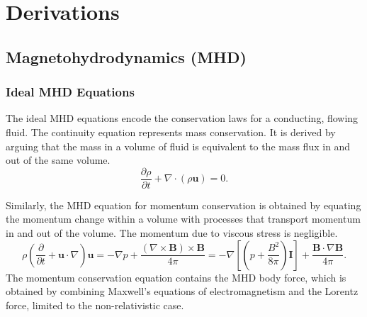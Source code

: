 \appendix

\chapter{Derivations}
\section{Magnetohydrodynamics (MHD)}

\subsection*{Ideal MHD Equations}
The ideal MHD equations encode the conservation laws for a conducting, flowing fluid.
The continuity equation represents mass conservation. It is derived by arguing that the mass in a volume of fluid is equivalent to the mass flux in and out of the same volume. 
\begin{equation}
    \label{eq:Continuity Eqn}
    \frac{\partial \rho}{\partial t} + \nabla \cdot (\rho \boldsymbol{u}) = 0.
\end{equation}

Similarly, the MHD equation for momentum conservation is obtained by equating the momentum change within a volume with processes that transport momentum in and out of the volume. The momentum due to viscous stress is negligible.
\begin{equation}
     \rho \left( \frac{\partial }{\partial t} + \boldsymbol{u} \cdot \nabla \right) \boldsymbol{u}
    = - \nabla p + \frac{(\nabla \times \boldsymbol{B}) \times \boldsymbol{B}}{4\pi}
    = - \nabla \left[
        \left( p + \frac{B^{2}}{8\pi} \right) \boldsymbol{I}
         \right] + \frac{\boldsymbol{B}\cdot \nabla\boldsymbol{B}}{4\pi}.  
    \label{eq:Momentum cons}
\end{equation}
The momentum conservation equation contains the MHD body force, which is obtained by combining Maxwell's equations of electromagnetism and the Lorentz force, limited to the non-relativistic case.


